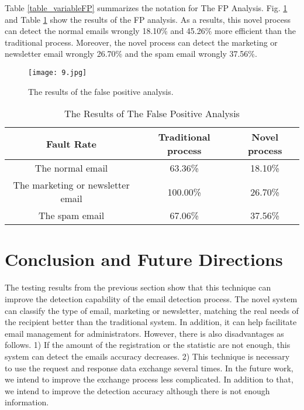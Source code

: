 \documentclass[conference]{IEEEtran}
\begin{document}
Table \ref{table_variableFP} summarizes the notation for The FP Analysis.
Fig. \ref{fig:resultFP} and Table \ref{table_resultsFP} show the results of the FP
analysis.
As a
results, this novel process can detect the normal emails wrongly 18.10\% and 45.26\% more efficient than the traditional process.
Moreover, the novel process can detect the marketing or newsletter email wrongly 26.70\% and the spam email wrongly 37.56\%. 

\begin{figure}
\centering
\texttt{[image: 9.jpg]}
\caption{The results of the false positive analysis.}
\label{fig:resultFP}
\end{figure}

\begin{table}[!t]
\renewcommand{\arraystretch}{1.2}
\caption{The Results of The False Positive Analysis}
\label{table_resultsFP}
\centering
\begin{tabular}{c|c|c}
\hline
\bfseries Fault Rate & \bfseries Traditional process & \bfseries Novel process\\
\hline
The normal email & 63.36\% & 18.10\%\\
\hline
The marketing or newsletter email & 100.00\% & 26.70\%\\
\hline
The spam email & 67.06\% & 37.56\%\\
\hline
\end{tabular}
\end{table}

\section{Conclusion and Future Directions}
The testing results from the previous section show that this technique can improve the detection capability of the email detection process.
The novel system can classify the type of email, marketing or newsletter, matching the real needs of the recipient better than the traditional system.
In addition, it can help facilitate email management for administrators.
However, there is also disadvantages as follows. 
1) If the amount of the registration or the statistic are not enough,  this system can detect the emails accuracy decreases.
2) This technique is necessary to use the request and response data exchange several times.
In the future work, we intend to improve the exchange process less complicated.
In addition to that, we intend to improve the detection accuracy although there is not enough information.
\end{document}
